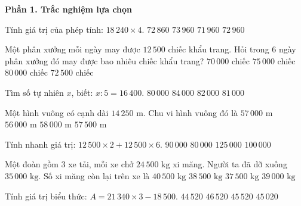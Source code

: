 \textbf{Phần 1. Trắc nghiệm lựa chọn}

\begin{ex} %
Tính giá trị của phép tính: $18\,240 \times 4$.
\choice
{$72\,860$}
{$73\,960$}
{$71\,960$}
{\True $72\,960$}
\end{ex}

\begin{ex} %
Một phân xưởng mỗi ngày may được $12\,500$ chiếc khẩu trang. Hỏi trong 6 ngày phân xưởng đó may được bao nhiêu chiếc khẩu trang?
\choice
{$70\,000$ chiếc}
{\True $75\,000$ chiếc}
{$80\,000$ chiếc}
{$72\,500$ chiếc}
\end{ex}

\begin{ex} %
Tìm số tự nhiên $x$, biết: $x : 5 = 16\,400$.
\choice
{$80\,000$}
{$84\,000$}
{\True $82\,000$}
{$81\,000$}
\end{ex}

\begin{ex} %
Một hình vuông có cạnh dài $14\,250\text{ m}$. Chu vi hình vuông đó là
\choice
{\True $57\,000\text{ m}$}
{$56\,000\text{ m}$}
{$58\,000\text{ m}$}
{$57\,500\text{ m}$}
\end{ex}

\begin{ex} %
Tính nhanh giá trị: $12\,500 \times 2 + 12\,500 \times 6$.
\choice
{$90\,000$}
{$80\,000$}
{$125\,000$}
{\True $100\,000$}
\end{ex}

\begin{ex} %
Một đoàn gồm 3 xe tải, mỗi xe chở $24\,500\text{ kg}$ xi măng. Người ta đã dỡ xuống $35\,000\text{ kg}$. Số xi măng còn lại trên xe là
\choice
{$40\,500\text{ kg}$}
{\True $38\,500\text{ kg}$}
{$37\,500\text{ kg}$}
{$39\,000\text{ kg}$}
\end{ex}

\begin{ex} %
Tính giá trị biểu thức: $A = 21\,340 \times 3 - 18\,500$.
\choice
{$44\,520$}
{$46\,520$}
{\True $45\,520$}
{$45\,020$}
\end{ex}

